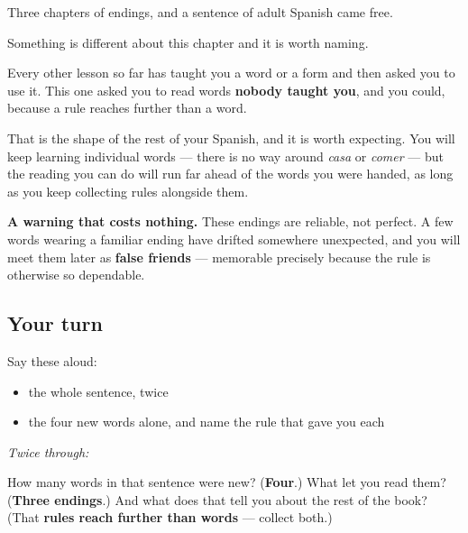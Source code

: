 Three chapters of endings, and a sentence of adult Spanish came free.

\begin{grammarlens}[title={Grammar Lens: what has actually changed}]
Something is different about this chapter and it is worth naming.

Every other lesson so far has taught you a word or a form and then asked you to use it. This one asked you to read words \textbf{nobody taught you}, and you could, because a rule reaches further than a word.

That is the shape of the rest of your Spanish, and it is worth expecting. You will keep learning individual words — there is no way around \emph{casa} or \emph{comer} — but the reading you can do will run far ahead of the words you were handed, as long as you keep collecting rules alongside them.

\textbf{A warning that costs nothing.} These endings are reliable, not perfect. A few words wearing a familiar ending have drifted somewhere unexpected, and you will meet them later as \textbf{false friends} — memorable precisely because the rule is otherwise so dependable.
\end{grammarlens}

\subsection*{Your turn}
Say these aloud:

\begin{itemize}
\raggedright
  \item the whole sentence, twice
  \item the four new words alone, and name the rule that gave you each
\end{itemize}

\emph{Twice through:}

\begin{tcolorbox}[breakable,colback=teal!4,colframe=teal!35!black,title={Before you move on}]
How many words in that sentence were new? (\textbf{Four}.) What let you read them? (\textbf{Three endings}.) And what does that tell you about the rest of the book? (That \textbf{rules reach further than words} — collect both.)
\end{tcolorbox}
